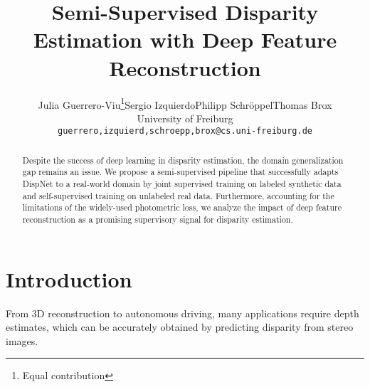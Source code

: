 \documentclass[final]{cvpr}
\begin{document}
\title{Semi-Supervised Disparity Estimation with Deep Feature Reconstruction}

\author{Julia Guerrero-Viu\thanks{Equal contribution}\qquad Sergio Izquierdo\footnotemark[1]\qquad Philipp Schr\"oppel\qquad Thomas Brox\\
University of Freiburg\\
{\tt\small guerrero,izquierd,schroepp,brox@cs.uni-freiburg.de}
}

\maketitle


\begin{abstract}
    Despite the success of deep learning in disparity estimation, the domain generalization gap remains an issue. We propose a semi-supervised pipeline that successfully adapts DispNet to a real-world domain by joint supervised training on labeled synthetic data and self-supervised training on unlabeled real data. Furthermore, accounting for the limitations of the widely-used photometric loss, we analyze the impact of deep feature reconstruction as a promising supervisory signal for disparity estimation.
\end{abstract}

\section{Introduction}
From 3D reconstruction to autonomous driving, many applications require depth estimates, which can be accurately obtained by predicting disparity from stereo images. 
\end{document}
